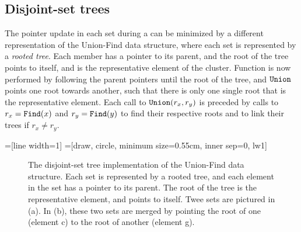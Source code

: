\subsection{Disjoint-set trees}
The pointer update in each set during a  can be minimized by a different representation of the Union-Find data structure, where each set is represented by a \emph{rooted tree}. Each member has a pointer to its parent, and the root of the tree points to itself, and is the representative element of the cluster. Function  is now performed by following the parent pointers until the root of the tree, and $\texttt{Union}$ points one root towards another, such that there is only one single root that is the representative element. Each call to $\texttt{Union}(r_x,r_y)$ is preceded by calls to $r_x=\texttt{Find}(x)$ and $r_y=\texttt{Find}(y)$ to find their respective roots and to link their trees if $r_x \neq r_y$. 

=[line width=1]
=[draw, circle, minimum size=0.55cm, inner sep=0, lw1]

\begin{figure}[]
  \centering
  \caption{The disjoint-set tree implementation of the Union-Find data structure. Each set is represented by a rooted tree, and each element in the set has a pointer to its parent. The root of the tree is the representative element, and points to itself. Twee sets are pictured in (a). In (b), these two sets are merged by pointing the root of one (element c) to the root of another (element g).}
  \label{fig:parentpointers}
\end{figure}

